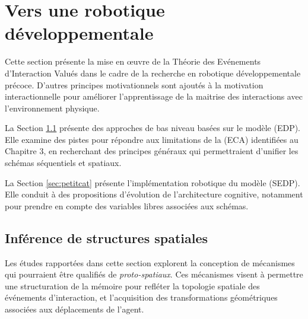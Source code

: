 \chapter{Vers une robotique développementale}
\label{chap:perspective}


\noindent
Cette section présente la mise en \oe uvre de la Théorie des Evénements d'Interaction Valués dans le cadre de la recherche en robotique développementale précoce.  
D'autres principes motivationnels sont ajoutés à la motivation interactionnelle pour améliorer l'apprentissage de la maitrise des interactions avec l'environnement physique.

La Section \ref{sec:spatial_inference} présente des approches de bas niveau basées sur le modèle  (EDP). 
Elle examine des pistes pour répondre aux limitations de la  (ECA) identifiées au Chapitre 3, en recherchant des principes généraux qui permettraient d'unifier les schémas séquentiels et spatiaux. 

La Section \ref{sec:petitcat} présente l'implémentation robotique du modèle  (SEDP). 
Elle conduit à des propositions d'évolution de l'architecture cognitive, notamment pour prendre en compte des variables libres associées aux schémas.




\section{Inférence de structures spatiales}
\label{sec:spatial_inference}

\noindent
Les études rapportées dans cette section explorent la conception de mécanismes qui pourraient être qualifiés de \emph{proto-spatiaux}. 
Ces mécanismes visent à permettre une structuration de la mémoire pour refléter la topologie spatiale des événements d'interaction, et l'acquisition des transformations géométriques associées aux déplacements de l'agent. 


